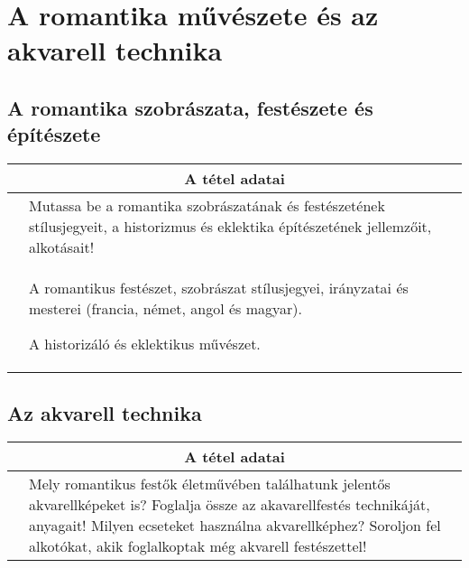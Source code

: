 \chapter{A romantika művészete és az akvarell technika} %
\label{ch:13_romantika}

\section{A romantika szobrászata, festészete és építészete}

\begin{center}
	\begin{longtable}{ | p{} | p{} | }
		
		\hline
		\multicolumn{2}{|c|}{\textbf{A tétel adatai}}
		\\ \hline
		
		\hline
		
		\centering{Tétel teljes címe}
		&
		Mutassa be a romantika szobrászatának és festészetének stílusjegyeit, a historizmus és eklektika építészetének jellemzőit, alkotásait! 
		\\ \hline
		
		\centering{Jegyzetek}
		&
		\begin{compactitem}
			\item A romantikus festészet, szobrászat stílusjegyei, irányzatai és mesterei (francia, német, angol és magyar).
			\item A historizáló és eklektikus művészet.
		\end{compactitem}
		\\\hline
		
	\end{longtable}
\end{center}

\cleardoublepage


\section{Az akvarell technika}

\begin{center}
	\begin{longtable}{ | p{} | p{} | }
		
		\hline
		\multicolumn{2}{|c|}{\textbf{A tétel adatai}}
		\\ \hline
		\hline
		
		\centering{Tétel teljes címe} 
		&
		Mely romantikus festők életművében találhatunk jelentős akvarellképeket is? Foglalja össze az akavarellfestés technikáját, anyagait! Milyen ecseteket használna akvarellképhez? Soroljon fel alkotókat, akik foglalkoptak még akvarell festészettel!
		\\ \hline
		
	\end{longtable}
\end{center}
